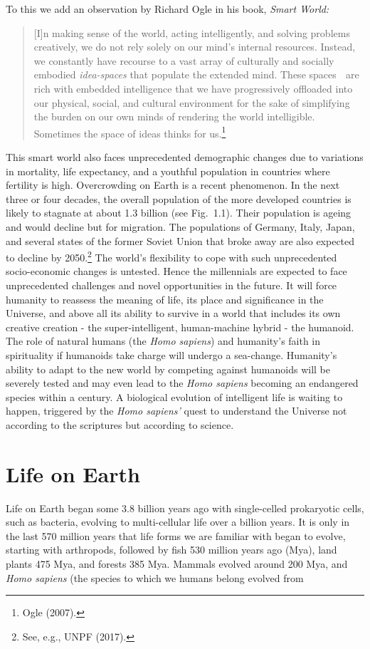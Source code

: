 \begin{multicols}{2}
To this we add an observation by Richard Ogle in his book, \textit{Smart World:}
\begin{quote}
[I]n making sense of the world, acting intelligently, and solving problems creatively, we do not rely solely on our mind's internal resources. Instead, we constantly have recourse to a vast array of culturally and socially embodied \textit{idea-spaces} that populate the extended mind. These spaces  are rich with embedded intelligence that we have progressively offloaded into our physical, social, and cultural environment for the sake of simplifying the burden on our own minds of rendering the world intelligible. Sometimes the space of ideas thinks for us.\footnote{Ogle (2007).}
\end{quote}

This smart world also faces unprecedented demographic changes due to variations in mortality, life expectancy, and a youthful population in countries where fertility is high. Overcrowding on Earth is a recent phenomenon. In the next three or four decades, the overall population of the more developed countries is likely to stagnate at about 1.3 billion (see Fig.~1.1). Their population is ageing and would decline but for migration. The populations of Germany, Italy, Japan, and several states of the former Soviet Union that broke away are also expected to decline by 2050.\footnote{See, e.g., UNPF (2017).} The world's flexibility to cope with such unprecedented socio-economic changes is untested. Hence the millennials are expected to face unprecedented challenges and novel opportunities in the future. It will force humanity to reassess the meaning of life, its place and significance in the Universe, and above all its ability to survive in a world that includes its own creative creation - the super-intelligent, human-machine hybrid - the humanoid. The role of natural humans (the \textit{Homo sapiens}) and humanity's faith in spirituality if humanoids take charge will undergo a sea-change. Humanity's ability to adapt to the new world by competing against humanoids will be severely tested and may even lead to the \textit{Homo sapiens} becoming an endangered species within a century. A biological evolution of intelligent life is waiting to happen, triggered by the \textit{Homo sapiens'} quest to understand the Universe not according to the scriptures but according to science.

\section{Life on Earth}

{\parfillskip=0pt
Life on Earth began some 3.8 billion years ago with single-celled prokaryotic cells, such as bacteria, evolving to multi-cellular life over a billion years. It is only in the last 570 million years that life forms we are familiar with began to evolve, starting with arthropods, followed by fish 530 million years ago (Mya), land plants 475 Mya, and forests 385 Mya. Mammals evolved around 200 Mya, and \textit{Homo sapiens} (the species to which we humans belong evolved from\par}

\end{multicols}

